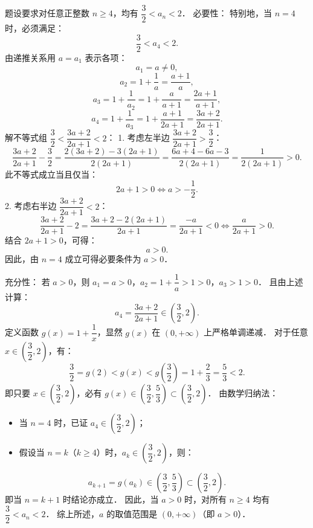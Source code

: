 \begin{answer}

题设要求对任意正整数 $n \geqslant 4$，均有 $\dfrac{3}{2} < a_n < 2$．
必要性：
特别地，当 $n = 4$ 时，必须满足：
\nopagebreak[4]
\[
\frac{3}{2} < a_4 < 2.
\]
由递推关系用 $a = a_1$ 表示各项：
\nopagebreak[4]
\[
a_1 = a \neq 0,
\]
\nopagebreak[4]
\[
a_2 = 1 + \frac{1}{a} = \frac{a + 1}{a},
\]
\nopagebreak[4]
\[
a_3 = 1 + \frac{1}{a_2} = 1 + \frac{a}{a + 1} = \frac{2a + 1}{a + 1},
\]
\nopagebreak[4]
\[
a_4 = 1 + \frac{1}{a_3} = 1 + \frac{a + 1}{2a + 1} = \frac{3a + 2}{2a + 1}.
\]
解不等式组 $\dfrac{3}{2} < \dfrac{3a + 2}{2a + 1} < 2$：
1. 考虑左半边 $\dfrac{3a + 2}{2a + 1} > \dfrac{3}{2}$：
\nopagebreak[4]
\[
\frac{3a + 2}{2a + 1} - \frac{3}{2} = \frac{2(3a + 2) - 3(2a + 1)}{2(2a + 1)} = \frac{6a + 4 - 6a - 3}{2(2a + 1)} = \frac{1}{2(2a + 1)} > 0.
\]
此不等式成立当且仅当：
\nopagebreak[4]
\[
2a + 1 > 0 \iff a > -\frac{1}{2}.
\]
2. 考虑右半边 $\dfrac{3a + 2}{2a + 1} < 2$：
\nopagebreak[4]
\[
\frac{3a + 2}{2a + 1} - 2 = \frac{3a + 2 - 2(2a + 1)}{2a + 1} = \frac{-a}{2a + 1} < 0 \iff \frac{a}{2a + 1} > 0.
\]
结合 $2a + 1 > 0$，可得：
\nopagebreak[4]
\[
a > 0.
\]
因此，由 $n = 4$ 成立可得必要条件为 $a > 0$．

充分性：
若 $a > 0$，则 $a_1 = a > 0$，$a_2 = 1 + \dfrac{1}{a} > 1 > 0$，$a_3 > 1 > 0$．
且由上述计算：
\nopagebreak[4]
\[
a_4 = \frac{3a + 2}{2a + 1} \in \left(\frac{3}{2}, 2\right).
\]
定义函数 $g(x) = 1 + \dfrac{1}{x}$，显然 $g(x)$ 在 $(0, +\infty)$ 上严格单调递减．
对于任意 $x \in \left(\dfrac{3}{2}, 2\right)$，有：
\nopagebreak[4]
\[
\frac{3}{2} = g(2) < g(x) < g\left(\frac{3}{2}\right) = 1 + \frac{2}{3} = \frac{5}{3} < 2.
\]
即只要 $x \in \left(\dfrac{3}{2}, 2\right)$，必有 $g(x) \in \left(\dfrac{3}{2}, \dfrac{5}{3}\right) \subset \left(\dfrac{3}{2}, 2\right)$．
由数学归纳法：
\begin{itemize}
\item 当 $n = 4$ 时，已证 $a_4 \in \left(\dfrac{3}{2}, 2\right)$；
\item 假设当 $n = k$（$k \geqslant 4$）时，$a_k \in \left(\dfrac{3}{2}, 2\right)$，则：
\end{itemize}
\nopagebreak[4]
\[
a_{k+1} = g(a_k) \in \left(\frac{3}{2}, \frac{5}{3}\right) \subset \left(\frac{3}{2}, 2\right).
\]
即当 $n = k + 1$ 时结论亦成立．
因此，当 $a > 0$ 时，对所有 $n \geqslant 4$ 均有 $\dfrac{3}{2} < a_n < 2$．
综上所述，$a$ 的取值范围是 $(0, +\infty)$（即 $a > 0$）．




\end{answer}